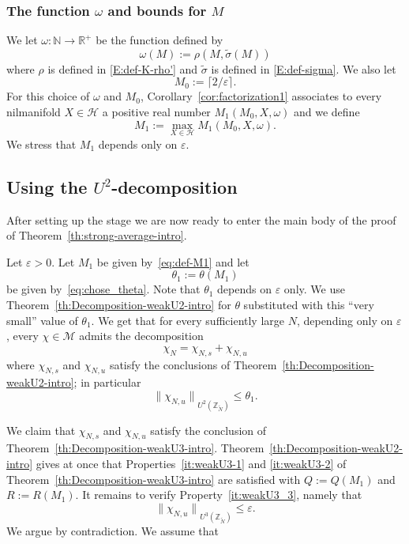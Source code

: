 \documentclass[11pt]{amsart}
\theoremstyle{definition}
\begin{document}
\subsubsection{The  function $\omega$ and bounds for $M$}
\label{SS:def-parameters} We   let  $\omega\colon {{\mathbb N}}\to {{\mathbb R}}^+$ be the
function defined by
\begin{equation}
\label{E:def-omega} \omega(M):=
\rho(M,\tilde{\sigma}(M))
\end{equation}
where $\rho$ is defined in \eqref{E:def-K-rho'}  and
$\tilde{\sigma}$ is defined in \eqref{E:def-sigma}. We also let
\begin{equation}
\label{eq:def_M0} M_0:= \lceil 2/{\varepsilon}\rceil.
\end{equation}
For this choice of  $\omega$  and  $M_0$,
Corollary~\ref{cor:factorization1} associates to every nilmanifold
$X\in{{\mathcal H}}$ a  positive real number $M_1(M_0,X,\omega)$ and we define
\begin{equation}
\label{eq:def-M1}
M_1:=\max_{X\in {{\mathcal H}}}M_1(M_0,X,\omega).
\end{equation}
We stress that   $M_1$  depends only on ${\varepsilon}$.
\subsection{Using the $U^2$-decomposition}\label{SS:Strategy}
After setting up the stage we are now ready to enter the main body
of the  proof of Theorem~\ref{th:strong-average-intro}.

Let ${\varepsilon}>0$. Let $M_1$ be given by~\eqref{eq:def-M1} and let
\begin{equation}\label{E:theta1}
 \theta_1:=\theta(M_1)
\end{equation}
be given by~\eqref{eq:chose_theta}. Note that  $\theta_1$ depends on
${\varepsilon}$ only.
We use Theorem~\ref{th:Decomposition-weakU2-intro} for $\theta$
substituted with this ``very small'' value of $\theta_1$. We get
that for every sufficiently large $N$, depending only on ${\varepsilon}$,
every
 $\chi\in{{\mathcal M}}$   admits the decomposition
$$
\chi_N=\chi_{N,s}+\chi_{N,u}
$$
where $\chi_{N,s}$ and $\chi_{N,u}$ satisfy the conclusions of
Theorem~\ref{th:Decomposition-weakU2-intro};  in particular
\begin{equation}
\label{eq:U2_Chi_u} {\lVert {\chi_{N,u}} \rVert}_{U^2({{\mathbb Z}}_{{\widetilde N}})}\leq\theta_1.
\end{equation}

We claim that $\chi_{N,s}$ and $\chi_{N,u}$ satisfy the conclusion
of Theorem~\ref{th:Decomposition-weakU3-intro}.
Theorem~\ref{th:Decomposition-weakU2-intro} gives at once that
Properties~\eqref{it:weakU3-1} and \eqref{it:weakU3-2} of
Theorem~\ref{th:Decomposition-weakU3-intro} are satisfied with
$Q:=Q(M_1)$ and $R:=R(M_1)$. It remains to verify
Property~\eqref{it:weakU3_3}, namely that
$$
{\lVert {\chi_{N,u}} \rVert}_{U^3({{\mathbb Z}}_{{\widetilde N}})}\leq{\varepsilon}.
$$
We argue by contradiction. We assume  that
 
\end{document}
